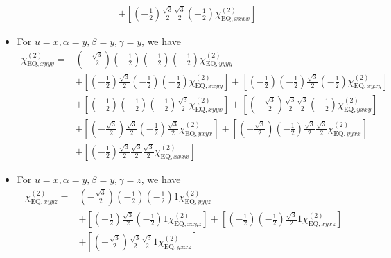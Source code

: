 \documentclass[UTF8,10pt,a4paper]{article}
\begin{document}
\begin{itemize}
\begin{align}
&+\left[\left(-\frac{1}{2}\right)\frac{\sqrt{3}}{2}\frac{\sqrt{3}}{2}\left(-\frac{1}{2}\right)\chi_{\text{EQ},xxxx}^{(2)}\right]
\end{align}\normalsize
\item For $u=x,\alpha=y,\beta=y,\gamma=y$, we have
\footnotesize\begin{align}
\nonumber\chi_{\text{EQ},xyyy}^{(2)}=&\left(-\frac{\sqrt{3}}{2}\right)\left(-\frac{1}{2}\right)\left(-\frac{1}{2}\right)\left(-\frac{1}{2}\right)\chi_{\text{EQ},yyyy}^{(2)}\\
\nonumber&+\left[\left(-\frac{1}{2}\right)\frac{\sqrt{3}}{2}\left(-\frac{1}{2}\right)\left(-\frac{1}{2}\right)\chi_{\text{EQ},xxyy}^{(2)}\right]+\left[\left(-\frac{1}{2}\right)\left(-\frac{1}{2}\right)\frac{\sqrt{3}}{2}\left(-\frac{1}{2}\right)\chi_{\text{EQ},xyxy}^{(2)}\right]\\
\nonumber&+\left[\left(-\frac{1}{2}\right)\left(-\frac{1}{2}\right)\left(-\frac{1}{2}\right)\frac{\sqrt{3}}{2}\chi_{\text{EQ},xyyx}^{(2)}\right]+\left[\left(-\frac{\sqrt{3}}{2}\right)\frac{\sqrt{3}}{2}\frac{\sqrt{3}}{2}\left(-\frac{1}{2}\right)\chi_{\text{EQ},yxxy}^{(2)}\right]\\
\nonumber&+\left[\left(-\frac{\sqrt{3}}{2}\right)\frac{\sqrt{3}}{2}\left(-\frac{1}{2}\right)\frac{\sqrt{3}}{2}\chi_{\text{EQ},yxyx}^{(2)}\right]+\left[\left(-\frac{\sqrt{3}}{2}\right)\left(-\frac{1}{2}\right)\frac{\sqrt{3}}{2}\frac{\sqrt{3}}{2}\chi_{\text{EQ},yyxx}^{(2)}\right]\\
&+\left[\left(-\frac{1}{2}\right)\frac{\sqrt{3}}{2}\frac{\sqrt{3}}{2}\frac{\sqrt{3}}{2}\chi_{\text{EQ},xxxx}^{(2)}\right]
\end{align}\normalsize
\item For $u=x,\alpha=y,\beta=y,\gamma=z$, we have
\footnotesize\begin{align}
\nonumber\chi_{\text{EQ},xyyz}^{(2)}=&\left(-\frac{\sqrt{3}}{2}\right)\left(-\frac{1}{2}\right)\left(-\frac{1}{2}\right)1\chi_{\text{EQ},yyyz}^{(2)}\\
\nonumber&+\left[\left(-\frac{1}{2}\right)\frac{\sqrt{3}}{2}\left(-\frac{1}{2}\right)1\chi_{\text{EQ},xxyz}^{(2)}\right]+\left[\left(-\frac{1}{2}\right)\left(-\frac{1}{2}\right)\frac{\sqrt{3}}{2}1\chi_{\text{EQ},xyxz}^{(2)}\right]\\
\nonumber&+\left[\left(-\frac{\sqrt{3}}{2}\right)\frac{\sqrt{3}}{2}\frac{\sqrt{3}}{2}1\chi_{\text{EQ},yxxz}^{(2)}\right]\\
\nonumber&\\
&
\end{align}\normalsize

\end{itemize}
\end{document}
